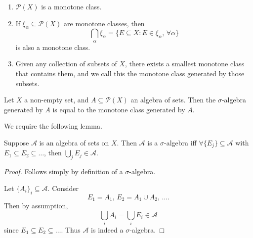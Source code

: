 \documentclass[notoc,notitlepage]{tufte-book}
\begin{document}
\begin{note}
  \begin{enumerate}
    \item $\mathcal{P}(X)$ is a monotone class.
    \item If $\xi_\alpha \subseteq \mathcal{P}(X)$ are monotone classes,
      then
      \begin{equation*}
        \bigcap_{\alpha} \xi_\alpha = \{ 
          E \subseteq X : E \in \xi_\alpha,\, \forall \alpha
        \}
      \end{equation*}
      is also a monotone class.
    \item Given any collection of subsets of $X$,
      there exists a smallest monotone class that contains them,
      and we call this the monotone class generated by those subsets.
  \end{enumerate}
\end{note}

\begin{thm}\label{thm:monotone_class_theorem}
  Let $X$ a non-empty set,
  and $A \subseteq \mathcal{P}(X)$ an algebra of sets.
  Then the $\sigma$-algebra generated by $A$ is equal
  to the monotone class generated by $A$.
\end{thm}

We require the following lemma.

\begin{lemma}\label{lemma:lemma_for_monotone_class_theorem}
  Suppose $\mathcal{A}$ is an algebra of sets on $X$.
  Then $\mathcal{A}$ is a $\sigma$-algebra iff
  $\forall \{ E_j \} \subseteq \mathcal{A}$
  with $E_1 \subseteq E_2 \subseteq \hdots$,
  then $\bigcup_{j} E_j \in \mathcal{A}$.
\end{lemma}

\begin{proof}
  \hlbnoted{$(\implies)$} Follows simply by definition of a $\sigma$-algebra.

  \noindent
  \hlbnoted{$(\impliedby)$} Let $\{ A_i \}_i \subseteq \mathcal{A}$.
  Consider
  \begin{equation*}
    E_1 = A_1,\, E_2 = A_1 \cup A_2,\, \hdots.
  \end{equation*}
  Then by assumption,
  \begin{equation*}
    \bigcup_{i} A_i = \bigcup_{i} E_i \in \mathcal{A}
  \end{equation*}
  since $E_1 \subseteq E_2 \subseteq \hdots$.
  Thus $\mathcal{A}$ is indeed a $\sigma$-algebra.
\end{proof}
\end{document}
